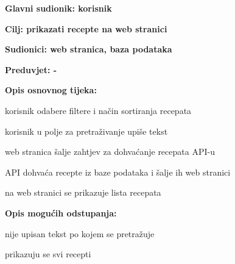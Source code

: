 					\noindent {}
					\begin{packed_item}
						\item \textbf{Glavni sudionik: korisnik}
						\item  \textbf{Cilj: prikazati recepte na web stranici}
						\item  \textbf{Sudionici: web stranica, baza podataka}
						\item  \textbf{Preduvjet: -}
						
						\item  \textbf{Opis osnovnog tijeka:}
						\item[] \begin{packed_enum}
							\item korisnik odabere filtere i način sortiranja recepata
							\item korisnik u polje za pretraživanje upiše tekst
							\item web stranica šalje zahtjev za dohvaćanje recepata API-u
							\item API dohvaća recepte iz baze podataka i šalje ih web stranici
							\item na web stranici se prikazuje lista recepata
						\end{packed_enum}
						
						\item  \textbf{Opis mogućih odstupanja:}
						\item[] \begin{packed_item}
							\item [5.a] nije upisan tekst po kojem se pretražuje
							\item[] \begin{packed_enum}
								\item prikazuju se svi recepti
							\end{packed_enum}
						\end{packed_item}
					\end{packed_item}


